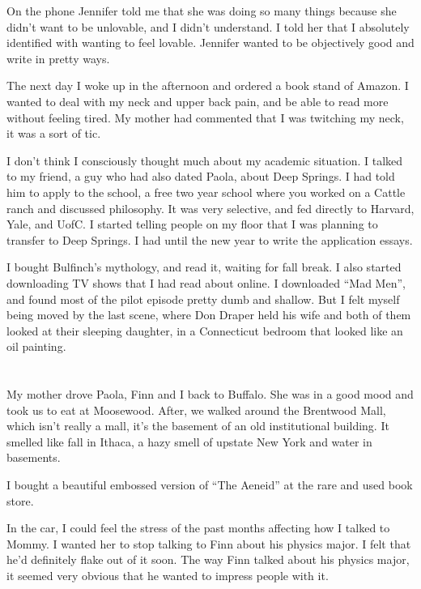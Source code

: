 On the phone Jennifer told me that she was doing so many things because she
didn't want to be unlovable, and I didn't understand.  I told her that I
absolutely identified with wanting to feel lovable.  Jennifer wanted to be
objectively good and write in pretty ways.

The next day I woke up in the afternoon and ordered a book stand of Amazon.  I
wanted to deal with my neck and upper back pain, and be able to read more
without feeling tired.  My mother had commented that I was twitching my neck, it
was a sort of tic. 

I don't think I consciously thought much about my academic situation.  I talked
to my friend, a guy who had also dated Paola, about Deep Springs.  I had told
him to apply to the school, a free two year school where you worked on a Cattle
ranch and discussed philosophy.  It was very selective, and fed directly to
Harvard, Yale, and UofC.  I started telling people on my floor that I was
planning to transfer to Deep Springs.  I had until the new year to write the
application essays.

I bought Bulfinch's mythology, and read it, waiting for fall break.  I also
started downloading TV shows that I had read about online.  I downloaded ``Mad
Men'', and found most of the pilot episode pretty dumb and shallow.  But I felt
myself being moved by the last scene, where Don Draper held his wife and both of
them looked at their sleeping daughter, in a Connecticut bedroom that looked
like an oil painting.

\section{}

My mother drove Paola, Finn and I back to Buffalo.  She was in a good mood and
took us to eat at Moosewood.  After, we walked around the Brentwood Mall, which
isn't really a mall, it's the basement of an old institutional building.  It
smelled like fall in Ithaca, a hazy smell of upstate New York and water in
basements. 

I bought a beautiful embossed version of ``The Aeneid'' at the rare and used book
store. 

In the car, I could feel the stress of the past months affecting how I talked
to Mommy. I  wanted her to stop talking to Finn about his physics major.  I
felt that he'd definitely flake out of it soon.  The way Finn talked about his
physics major, it seemed very obvious that he wanted to impress people with it. 

